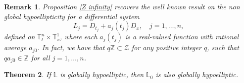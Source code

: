 \documentclass[12pt]{elsarticle}
\newtheorem{theorem}{Theorem}[section]
\newtheorem{remark}[theorem]{Remark}
\numberwithin{equation}{section}
\begin{document}
	\begin{remark}
		Proposition \ref{Z infinity} recovers the well known result on the non global hypoellipticity for a differential system 
		$$
		L_j = D_{t_j} + a_j(t_j) D_x, \quad j=1,\ldots,n,
		$$
		defined on $\mathbb{T}_t^n\times \mathbb{T}_x^1$, where each $a_j(t_j)$ is a real-valued function with rational  average $a_{j0}$. In fact, we have that $q \mathbb{Z}\subset \mathcal{Z}$ for any positive integer $q$, such that $q a_{j0}\in\mathbb{Z}$ for all $j=1,\ldots,n$.
	\end{remark}


\begin{theorem}\label{necessary condition} If  $\mathbb{L}$ is globally hypoelliptic, then $\mathbb{L}_0$ is also globally hypoelliptic.
\end{theorem}
\end{document}
